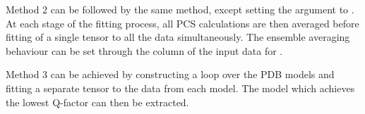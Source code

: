 \documentclass[a4paper,10pt,english,openany,oneside]{sphinxmanual}
\begin{document}
Method 2 can be followed by the same method, except setting the  argument to . At each stage of the fitting process, all PCS calculations are then averaged before fitting of a single tensor to all the data simultaneously. The ensemble averaging behaviour can be set through the  column of the input data for {\hyperref[\detokenize{reference/generated/paramagpy.fit.nlr_fit_metal_from_pcs:paramagpy.fit.nlr_fit_metal_from_pcs}]{}}.

%
\begin{sphinxVerbatim}[commandchars=\\\{\}]
\PYG{p}{[}\PYG{p}{]} \PYG{p}{[}\PYG{p}{]}  \PYG{p}{[}\PYG{p}{]} \PYG{p}{[}\PYG{p}{]}   
\PYG{p}{[}\PYG{p}{]} \PYG{p}{[}\PYG{p}{]}  \PYG{p}{[}\PYG{p}{]} \PYG{p}{[}\PYG{p}{]} 
   
    
\end{sphinxVerbatim}

Method 3 can be achieved by constructing a  loop over the PDB models and fitting a separate tensor to the data from each model. The model which achieves the lowest Q-factor can then be extracted.
\end{document}
